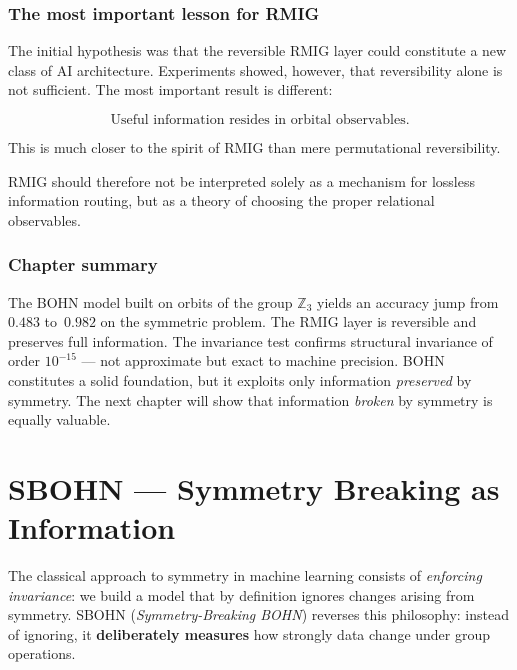 \documentclass[11pt,a4paper]{report}
\begin{document}
\subsection{The most important lesson for RMIG}

The initial hypothesis was that the reversible RMIG layer could constitute a new class of AI architecture. Experiments showed, however, that reversibility alone is not sufficient. The most important result is different:

\[
\boxed{\text{Useful information resides in orbital observables.}}
\]

This is much closer to the spirit of RMIG than mere permutational reversibility.

RMIG should therefore not be interpreted solely as a mechanism for lossless information routing, but as a theory of choosing the proper relational observables.






\subsection*{Chapter summary}
The BOHN model built on orbits of the group $\mathbb{Z}_3$ yields an accuracy jump from~$0.483$ to~$0.982$ on the symmetric problem. The RMIG layer is reversible and preserves full information. The invariance test confirms structural invariance of order $10^{-15}$ --- not approximate but exact to machine precision. BOHN constitutes a solid foundation, but it exploits only information \emph{preserved} by symmetry. The next chapter will show that information \emph{broken} by symmetry is equally valuable.

\newpage


\chapter{SBOHN --- Symmetry Breaking as Information}

The classical approach to symmetry in machine learning consists of \emph{enforcing invariance}: we build a model that by definition ignores changes arising from symmetry. SBOHN (\emph{Symmetry-Breaking BOHN}) reverses this philosophy: instead of ignoring, it \textbf{deliberately measures} how strongly data change under group operations.
\end{document}
